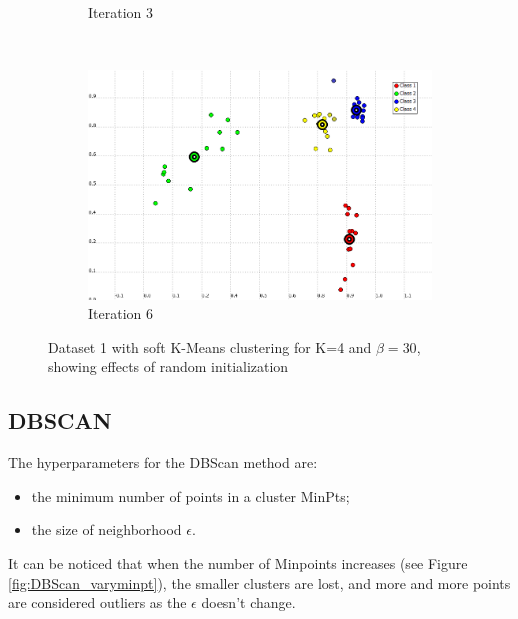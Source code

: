 \documentclass[a4paper,10pt]{article}
\begin{document}
\begin{figure}[H]
\begin{subfigure}[t]{0.2\textwidth}
      \caption{Iteration 3}
      \label{fig:K-Means-4K-beta-30-it3-2}
     \end{subfigure}
      ~
    \begin{subfigure}[t]{0.2\textwidth}
      \centering
      \includegraphics[width=\textwidth]{pictures/K-Means-4K-beta-30-it6(2).png}
      \caption{Iteration 6}
      \label{fig:K-Means-4K-beta-30-it6-2}
     \end{subfigure}
     \caption{Dataset 1 with soft K-Means clustering for K=4 and $\beta=30$, showing effects of random initialization}
     \label{fig:kmeans_init}
\end{figure}


\subsection{DBSCAN}

The hyperparameters for the DBScan method are:
\begin{itemize}
\item the minimum number of points in a cluster MinPts;
\item the size of neighborhood $\epsilon$.
\end{itemize}

It can be noticed that when the number of Minpoints increases (see Figure \ref{fig:DBScan_varyminpt}), the smaller clusters are lost, and more and more points are considered outliers as the $\epsilon$ doesn't change.
\end{document}
